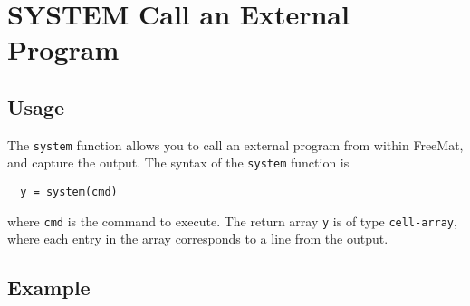 \section{SYSTEM Call an External Program}

\subsection{Usage}

The \verb|system| function allows you to call an external
program from within FreeMat, and capture the output.
The syntax of the \verb|system| function is
\begin{verbatim}
  y = system(cmd)
\end{verbatim}
where \verb|cmd| is the command to execute.  The return
array \verb|y| is of type \verb|cell-array|, where each entry
in the array corresponds to a line from the output.
\subsection{Example}

